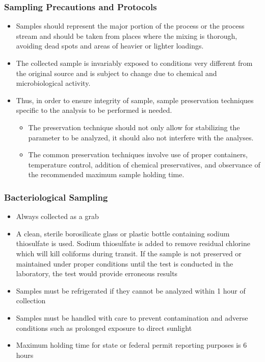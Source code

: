 \subsubsection{Sampling Precautions and Protocols}
			\begin{itemize}
				\item Samples should represent the major portion of the process or the process stream and should be taken from places where the mixing is thorough, avoiding dead spots and areas of heavier or lighter loadings. 
				\item The collected sample is invariably exposed to conditions very different from the original source and is subject to change due to chemical and microbiological activity.  
				\item Thus, in order to ensure integrity of sample, sample preservation techniques specific to the analysis to be performed is needed.  
				      \begin{itemize}
				      	\item The preservation technique should not only allow for stabilizing the parameter to be analyzed, it should also not interfere with the analyses.  
				      	\item The common preservation techniques involve use of proper containers, temperature control, addition of chemical preservatives, and observance of the recommended maximum sample holding time.
				      \end{itemize}
			\end{itemize}
			
\subsubsection{Bacteriological Sampling}
\begin{itemize}
\item Always collected as a grab
\item A clean, sterile borosilicate glass or plastic bottle containing sodium thiosulfate is used. Sodium thiosulfate is added to remove residual chlorine which will kill coliforms during transit. If the sample is not preserved or maintained under proper conditions until the test is conducted in the laboratory, the test would provide erroneous results
\item Samples must be refrigerated if they cannot be analyzed within 1 hour of collection
\item Samples must be handled with care to prevent contamination and adverse conditions such as prolonged exposure to direct sunlight
\item Maximum holding time for state or federal permit reporting purposes is 6 hours
\end{itemize} 


